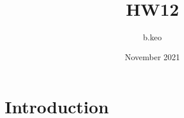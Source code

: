 \documentclass{article}
\title{HW12}
\author{b.keo }
\date{November 2021}
\begin{document}
\maketitle

\section{Introduction}
\end{document}
